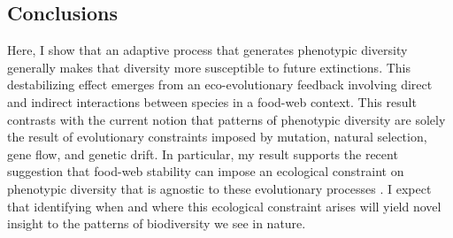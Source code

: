 \documentclass[11pt,]{article}
\begin{document}
\subsection{Conclusions}\label{conclusions}

Here, I show that an adaptive process that generates phenotypic
diversity generally makes that diversity more susceptible to future
extinctions. This destabilizing effect emerges from an eco-evolutionary
feedback involving direct and indirect interactions between species in a
food-web context. This result contrasts with the current notion that
patterns of phenotypic diversity are solely the result of evolutionary
constraints imposed by mutation, natural selection, gene flow, and
genetic drift. In particular, my result supports the recent suggestion
that food-web stability can impose an ecological constraint on
phenotypic diversity that is agnostic to these evolutionary processes
\citep{Borrelli2015b}. I expect that identifying when and where this
ecological constraint arises will yield novel insight to the patterns of
biodiversity we see in nature.


\end{document}
